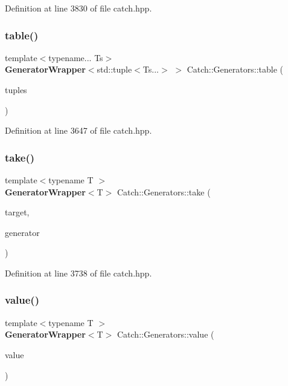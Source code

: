 Definition at line 3830 of file catch.\+hpp.

\mbox{\label{namespace_catch_1_1_generators_a6e0436ad4eddeabdc34281119201dbfe}} 
\subsubsection{table()}
{\footnotesize\ttfamily template$<$typename... Ts$>$ \\
\textbf{ Generator\+Wrapper}$<$std\+::tuple$<$Ts...$>$ $>$ Catch\+::\+Generators\+::table (\begin{DoxyParamCaption}\item[{std\+::initializer\+\_\+list$<$ std\+::tuple$<$ typename std\+::decay$<$ Ts $>$\+::type... $>$$>$}]{tuples }\end{DoxyParamCaption})}



Definition at line 3647 of file catch.\+hpp.

\mbox{\label{namespace_catch_1_1_generators_a972480864d60131946f6f53c566de070}} 
\subsubsection{take()}
{\footnotesize\ttfamily template$<$typename T $>$ \\
\textbf{ Generator\+Wrapper}$<$T$>$ Catch\+::\+Generators\+::take (\begin{DoxyParamCaption}\item[{size\+\_\+t}]{target,  }\item[{\textbf{ Generator\+Wrapper}$<$ T $>$ \&\&}]{generator }\end{DoxyParamCaption})}



Definition at line 3738 of file catch.\+hpp.

\mbox{\label{namespace_catch_1_1_generators_a3c4989dd0dca44455f55484cedaa18da}} 
\subsubsection{value()}
{\footnotesize\ttfamily template$<$typename T $>$ \\
\textbf{ Generator\+Wrapper}$<$T$>$ Catch\+::\+Generators\+::value (\begin{DoxyParamCaption}\item[{T \&\&}]{value }\end{DoxyParamCaption})}



